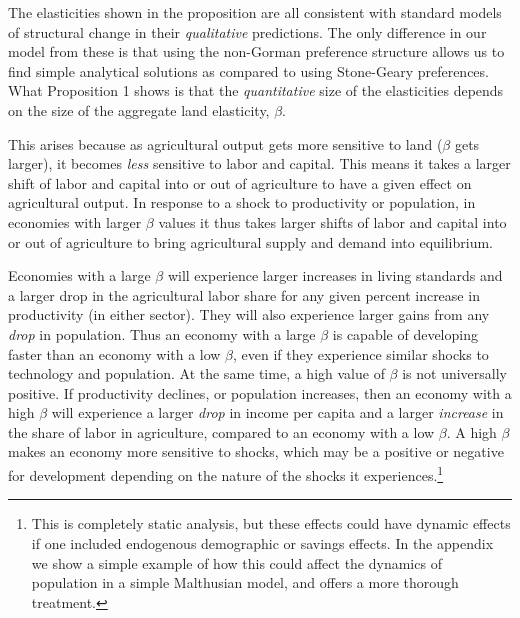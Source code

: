 \documentclass[11pt]{article}
\begin{document}
\vspace{.3cm} The elasticities shown in the proposition are all consistent with standard models of structural change \citep{kp2001,Gollin:2007oq,Restuccia:2008hc,Gollin:2010ys,vollrath2011,Alvarez-Cuadrado:2011nx,hrv2014,duarte2010role} in their \textit{qualitative} predictions. The only difference in our model from these is that using the non-Gorman preference structure allows us to find simple analytical solutions as compared to using Stone-Geary preferences. What Proposition 1 shows is that the \textit{quantitative} size of the elasticities depends on the size of the aggregate land elasticity, $\beta$. 

This arises because as agricultural output gets more sensitive to land ($\beta$ gets larger), it becomes \textit{less} sensitive to labor and capital. This means it takes a larger shift of labor and capital into or out of agriculture to have a given effect on agricultural output. In response to a shock to productivity or population, in economies with larger $\beta$ values it thus takes larger shifts of labor and capital into or out of agriculture to bring agricultural supply and demand into equilibrium. 

Economies with a large $\beta$ will experience larger increases in living standards and a larger drop in the agricultural labor share for any given percent increase in productivity (in either sector). They will also experience larger gains from any \textit{drop} in population. Thus an economy with a large $\beta$ is capable of developing faster than an economy with a low $\beta$, even if they experience similar shocks to technology and population. At the same time, a high value of $\beta$ is not universally positive. If productivity declines, or population increases, then an economy with a high $\beta$ will experience a larger \textit{drop} in income per capita and a larger \textit{increase} in the share of labor in agriculture, compared to an economy with a low $\beta$. A high $\beta$ makes an economy more sensitive to shocks, which may be a positive or negative for development depending on the nature of the shocks it experiences.\footnote{This is completely static analysis, but these effects could have dynamic effects if one included endogenous demographic or savings effects. In the appendix we show a simple example of how this could affect the dynamics of population in a simple Malthusian model, and \citet{vollrath2011} offers a more thorough treatment.}
\end{document}
